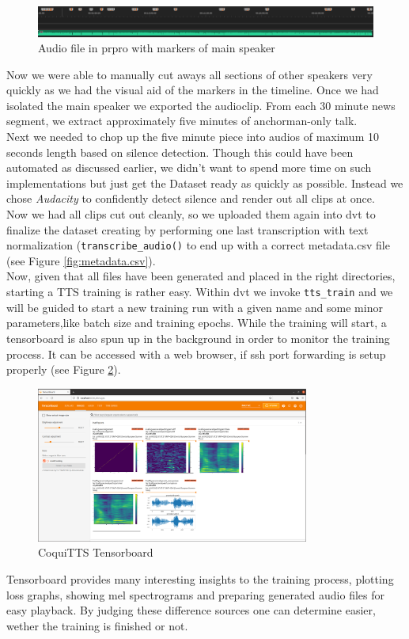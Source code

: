 \documentclass[
  a4paper,  %
  twoside,  %
  bibliography=totoc,
  headsepline,
  cleardoublepage=empty,
  parskip=half,
  draft=false
]{scrbook}
\begin{document}
\begin{figure}[h]
  \centering
  \includegraphics[width=1\textwidth]{./graphics/images/tts/premier with markers.png}
  \caption{Audio file in \gls{prpro} with markers of main speaker}
  \label{fig:premier-markers}
\end{figure}
Now we were able to manually cut aways all sections of other speakers very quickly as we had the visual aid of the markers in the timeline. Once we had isolated the main speaker we exported the audioclip. From each 30 minute news segment, we extract approximately five minutes of anchorman-only talk.\\
Next we needed to chop up the five minute piece into audios of maximum 10 seconds length based on silence detection. Though this could have been automated as discussed earlier, we didn't want to spend more time on such implementations but just get the Dataset ready as quickly as possible. Instead we chose \textit{Audacity} to confidently detect silence and render out all clips at once. \\
Now we had all clips cut out cleanly, so we uploaded them again into \gls{dvt} to finalize the dataset creating by performing one last transcription with text normalization (\verb|transcribe_audio()| to end up with a correct metadata.csv file (see Figure \ref{fig:metadata.csv}). \\
Now, given that all files have been generated and placed in the right directories, starting a TTS training is rather easy. Within \gls{dvt} we invoke \verb|tts_train| and we will be guided to start a new training run with a given name and some minor parameters,like batch size and training epochs. While the training will start, a tensorboard is also spun up in the background in order to monitor the training process. It can be accessed with a web browser, if ssh port forwarding is setup properly (see Figure \ref{fig:tensorboard}).
\begin{figure}[h]
  \centering
  \includegraphics[width=0.8\textwidth]{./graphics/images/tts/tensorboard.png}
  \caption{CoquiTTS Tensorboard \cite{TensorboardPngMbarnig2022}}
  \label{fig:tensorboard}
\end{figure}
Tensorboard provides many interesting insights to the training process, plotting loss graphs, showing mel spectrograms and preparing generated audio files for easy playback. By judging these difference sources one can determine easier, wether the training is finished or not. 
\end{document}
